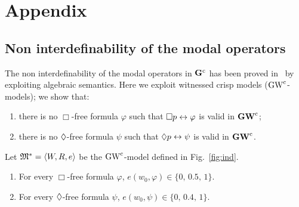 

\section{Appendix}
\label{sec:appendix}

\subsection{Non  interdefinability of the modal operators}\label{app:noninterdBD}

The non interdefinability of the modal operators in $\mathbf{G}^\mathrm{c}$ has been
proved in~\cite{RodriguezV:21} by exploiting algebraic semantics.
Here we exploit witnessed crisp models ($\mbox{$\mathrm{GW}^\mathrm{c}$}$-models); we show that:

\begin{enumerate}[label=(P\arabic*), ref=(P\arabic*),leftmargin=*]    
\item\label{defBD:P1}
  there is no  $\Box$-free formula $\varphi$ such that
  $\Box p \leftrightarrow\varphi$ is valid in  $\mathbf{GW}^\mathrm{c}$; 
  
\item\label{defBD:P2}
  there is no  $\lozenge$-free formula $\psi$ such that
  $\lozenge p \leftrightarrow\psi$ is valid in  $\mathbf{GW}^\mathrm{c}$. 
  
\end{enumerate}


\begin{lemma}\label{lemma:defBD}
  Let $\mathfrak{M}^\ast=\langle W,R,e \rangle$ be the  $\mbox{$\mathrm{GW}^\mathrm{c}$}$-model defined in Fig.~\ref{fig:ind}.
  \begin{enumerate}[label=(\roman*), ref=(\roman*),leftmargin=*]    
  \item\label{lemma:defBD:1} For every $\Box$-free formula $\varphi$,
    $e(w_0,\varphi)\in\{0,\,0.5,\,1\}$.
    
  \item\label{lemma:defBD:2} For every $\lozenge$-free formula $\psi$,
    $e(w_0,\psi)\in\{0,\,0.4,\,1\}$.
  \end{enumerate}
\end{lemma}


